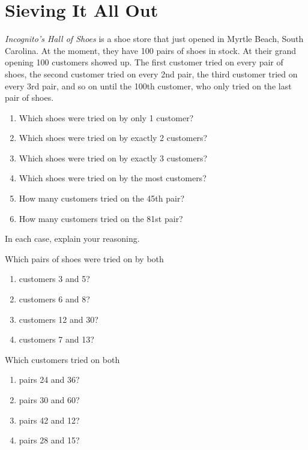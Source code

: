 \newpage
\section{Sieving It All Out}\label{A:Sie}
\begin{prob}  
\textit{Incognito's Hall of Shoes} is a shoe store that just
  opened in Myrtle Beach, South Carolina. At the moment, they have 100
  pairs of shoes in stock. At their grand opening 100 customers showed
  up. The first customer tried on every pair of shoes, the second
  customer tried on every 2nd pair, the third customer tried on every
  3rd pair, and so on until the 100th customer, who only tried on the
  last pair of shoes.
\begin{enumerate}
\item Which shoes were tried on by only 1 customer?
\item Which shoes were tried on by exactly 2 customers?
\item Which shoes were tried on by exactly 3 customers?
\item Which shoes were tried on by the most customers?
\item How many customers tried on the 45th pair?  
\item How many customers tried on the 81st pair?  
\end{enumerate}
In each case, explain your reasoning.
\end{prob}

\begin{prob}
Which pairs of shoes were tried on by both 
\begin{enumerate}
\item customers 3 and 5?
\item customers 6 and 8?
\item customers 12 and 30?
\item customers 7 and 13?
\end{enumerate}
\end{prob}

\begin{prob}
Which customers tried on both 
\begin{enumerate}
\item pairs 24 and 36?
\item pairs 30 and 60?
\item pairs 42 and 12?
\item pairs 28 and 15?
\end{enumerate}
\end{prob}


